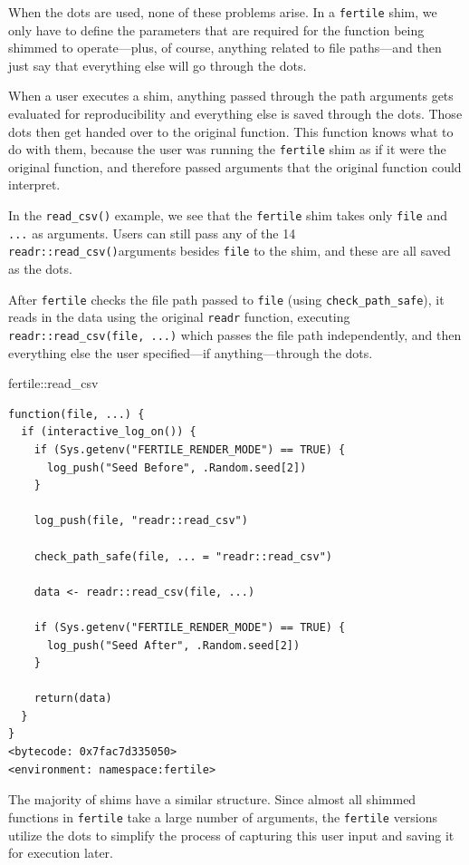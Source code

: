 \documentclass[12pt,twoside]{reedthesis}
\newenvironment{Shaded}{\begin{snugshade}}{\end{snugshade}}
\newcommand{\NormalTok}[1]{#1}
\newcommand{\SpecialCharTok}[1]{\textcolor[rgb]{0.00,0.00,0.00}{#1}}
\begin{document}
When the dots are used, none of these problems arise. In a \texttt{fertile} shim, we only have to define the parameters that are required for the function being shimmed to operate---plus, of course, anything related to file paths---and then just say that everything else will go through the dots.

When a user executes a shim, anything passed through the path arguments gets evaluated for reproducibility and everything else is saved through the dots. Those dots then get handed over to the original function. This function knows what to do with them, because the user was running the \texttt{fertile} shim as if it were the original function, and therefore passed arguments that the original function could interpret.

In the \texttt{read\_csv()} example, we see that the \texttt{fertile} shim takes only \texttt{file} and \texttt{...} as arguments. Users can still pass any of the 14 \texttt{readr::read\_csv()}arguments besides \texttt{file} to the shim, and these are all saved as the dots.

After \texttt{fertile} checks the file path passed to \texttt{file} (using \texttt{check\_path\_safe}), it reads in the data using the original \texttt{readr} function, executing \texttt{readr::read\_csv(file,\ ...)} which passes the file path independently, and then everything else the user specified---if anything---through the dots.
\begin{Shaded}
\begin{Highlighting}[]
\NormalTok{fertile}\SpecialCharTok{::}\NormalTok{read\_csv}
\end{Highlighting}
\end{Shaded}
\begin{verbatim}
function(file, ...) {
  if (interactive_log_on()) {
    if (Sys.getenv("FERTILE_RENDER_MODE") == TRUE) {
      log_push("Seed Before", .Random.seed[2])
    }

    log_push(file, "readr::read_csv")

    check_path_safe(file, ... = "readr::read_csv")

    data <- readr::read_csv(file, ...)

    if (Sys.getenv("FERTILE_RENDER_MODE") == TRUE) {
      log_push("Seed After", .Random.seed[2])
    }

    return(data)
  }
}
<bytecode: 0x7fac7d335050>
<environment: namespace:fertile>
\end{verbatim}
The majority of shims have a similar structure. Since almost all shimmed functions in \texttt{fertile} take a large number of arguments, the \texttt{fertile} versions utilize the dots to simplify the process of capturing this user input and saving it for execution later.
\end{document}
